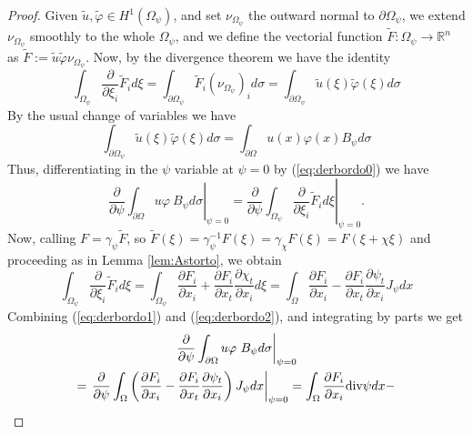 \documentclass[a4paper,reqno,11pt,oneside]{amsart}
\theoremstyle{plain}
\theoremstyle{plain}
\theoremstyle{plain}
\theoremstyle{remark}
\def\div{\textup{div}}
\begin{document}
\begin{proof}
Given $\tilde u, \tilde \varphi\in H^1(\Omega_\psi)$, and set $\nu_{\Omega_\psi}$ the outward normal to $\partial \Omega_\psi$, we extend $\nu_{\Omega_\psi}$ smoothly to the whole $\Omega_\psi$, and we define the vectorial function $\tilde F:\Omega_\psi\rightarrow \mathbb{R}^n$ as $\tilde F:=\tilde u\tilde \varphi \nu_{\Omega_\psi}$.  Now, by the divergence theorem we have the identity
\begin{equation}\label{eq:derbordo0}
    \int_{\Omega_\psi}\frac{\partial}{\partial \xi_i}\tilde F_i d\xi=\int_{\partial \Omega_\psi}\tilde F_i(\nu_{\Omega_\psi})_i d\sigma =
    \int_{\partial \Omega_\psi}\tilde u(\xi) \tilde \varphi (\xi) d\sigma 
\end{equation}
By the usual change of variables we have $$\int_{\partial \Omega_\psi}\tilde u(\xi) \tilde \varphi (\xi) d\sigma= \int_{\partial \Omega} u(x)  \varphi (x) B_\psi d\sigma $$
Thus, differentiating in the $\psi$ variable at $\psi=0$ by  (\ref{eq:derbordo0})  we have 
\begin{equation}\label{eq:derbordo1}
    \left. \frac{\partial}{\partial \psi}\int_{\partial \Omega} u\varphi\ B_\psi d\sigma\right|_{\psi=0}=\left. \frac{\partial}{\partial \psi}
      \int_{\Omega_\psi}\frac{\partial}{\partial \xi_i}\tilde F_i d\xi
    \right|_{\psi=0}.
\end{equation}
Now, calling $F=\gamma_\psi \tilde F$, so $\tilde F (\xi)= \gamma_\psi^{-1} F(\xi)=\gamma_\chi F(\xi)=F(\xi +\chi \xi)$ and proceeding as in Lemma \ref{lem:Astorto}, we obtain 
\begin{equation}\label{eq:derbordo2}
 \int_{\Omega_\psi}\frac{\partial}{\partial \xi_i}\tilde F_i d\xi=
  \int_{\Omega_\psi}\frac{\partial F_i}{\partial x_i}  +\frac{\partial  F_i }{\partial x_t}\frac{\partial \chi_t}{\partial x_i} d\xi=
   \int_{\Omega}\frac{\partial F_i}{\partial x_i}  -\frac{\partial  F_i }{\partial x_t}\frac{\partial \psi_t}{\partial x_i} J_\psi dx
\end{equation}
Combining (\ref{eq:derbordo1}) and (\ref{eq:derbordo2}), and integrating by parts we get
\begin{multline}
     \left. \frac{\partial}{\partial \psi}\int_{\partial \Omega} u\varphi\ B_\psi d\sigma\right|_{\psi=0}\\=
      \left. \frac{\partial}{\partial \psi}
       \int_{\Omega}
       \left(\frac{\partial F_i}{\partial x_i}  -\frac{\partial  F_i }{\partial x_t}\frac{\partial \psi_t}{\partial x_i}\right) J_\psi dx\textbf{}  
        \right|_{\psi=0}
        =\int_\Omega \frac{\partial F_i}{\partial x_i}\div \psi dx-

\end{multline}
\end{proof}
\end{document}
